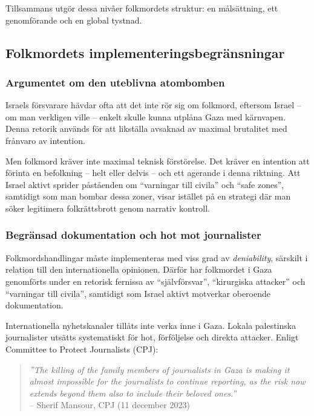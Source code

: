 Tillsammans utgör dessa nivåer folkmordets struktur: en målsättning, ett genomförande och en global tystnad.



\subsection{Folkmordets implementeringsbegränsningar}

\subsubsection*{Argumentet om den uteblivna atombomben}
Israels försvarare hävdar ofta att det inte rör sig om folkmord, eftersom Israel – om man verkligen ville – enkelt skulle kunna utplåna Gaza med kärnvapen. Denna retorik används för att likställa avsaknad av maximal brutalitet med frånvaro av intention.

Men folkmord kräver inte maximal teknisk förstörelse. Det kräver en intention att förinta en befolkning – helt eller delvis – och ett agerande i denna riktning. Att Israel aktivt sprider påståenden om \enquote{varningar till civila} och \enquote{safe zones}, samtidigt som man bombar dessa zoner, visar istället på en strategi där man söker legitimera folkrättsbrott genom narrativ kontroll.

\subsubsection*{Begränsad dokumentation och hot mot journalister}
Folkmordshandlingar måste implementeras med viss grad av \textit{deniability}, särskilt i relation till den internationella opinionen. Därför har folkmordet i Gaza genomförts under en retorisk fernissa av \enquote{självförsvar}, \enquote{kirurgiska attacker} och \enquote{varningar till civila}, samtidigt som Israel aktivt motverkar oberoende dokumentation.

Internationella nyhetskanaler tillåts inte verka inne i Gaza. Lokala palestinska journalister utsätts systematiskt för hot, förföljelse och direkta attacker. Enligt Committee to Protect Journalists (CPJ):

\begin{quote}
\textit{”The killing of the family members of journalists in Gaza is making it almost impossible for the journalists to continue reporting, as the risk now extends beyond them also to include their beloved ones.”} \\
\textup{– Sherif Mansour, CPJ (11 december 2023)}
\end{quote}

